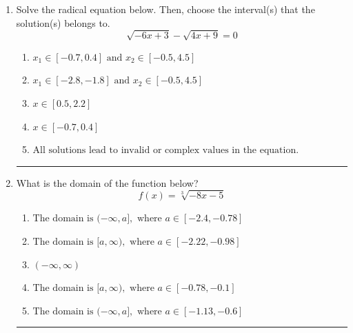 \documentclass[14pt]{extbook}
\newcommand{\litem}[1]{\item#1\hspace*{-1cm}\rule{\textwidth}{0.4pt}}
\begin{document}
\begin{enumerate}
\litem{
Solve the radical equation below. Then, choose the interval(s) that the solution(s) belongs to.\[ \sqrt{-6 x + 3} - \sqrt{4 x + 9} = 0 \]\begin{enumerate}[label=\Alph*.]
\item \( x_1 \in [-0.7, 0.4] \text{ and } x_2 \in [-0.5,4.5] \)
\item \( x_1 \in [-2.8, -1.8] \text{ and } x_2 \in [-0.5,4.5] \)
\item \( x \in [0.5,2.2] \)
\item \( x \in [-0.7,0.4] \)
\item \( \text{All solutions lead to invalid or complex values in the equation.} \)

\end{enumerate} }
\litem{
What is the domain of the function below?\[ f(x) = \sqrt[3]{-8 x - 5} \]\begin{enumerate}[label=\Alph*.]
\item \( \text{The domain is } (-\infty, a], \text{   where } a \in [-2.4, -0.78] \)
\item \( \text{The domain is } [a, \infty), \text{   where } a \in [-2.22, -0.98] \)
\item \( (-\infty, \infty) \)
\item \( \text{The domain is } [a, \infty), \text{   where } a \in [-0.78, -0.1] \)
\item \( \text{The domain is } (-\infty, a], \text{   where } a \in [-1.13, -0.6] \)


\end{enumerate}}
\end{enumerate}
\end{document}
